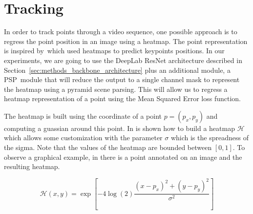 

\section{Tracking}
\label{sec:methods_tracking}

In order to track points through a video sequence, one possible approach is to regress the point position in an image using a heatmap.
The point representation is inspired by~\hourglass which used heatmaps to predict keypoints positions.
In our experiments, we are going to use the DeepLab ResNet architecture described in Section~\ref{sec:methods_backbone_architecture} plus an additional module, a PSP~\pspnet module that will reduce the output to a single channel mask to represent the heatmap using a pyramid scene parsing.
This will allow us to regress a heatmap representation of a point using the Mean Squared Error loss function.

The heatmap is built using the coordinate of a point $p = (p_x, p_y)$ and computing a guassian around this point.
In  is shown how to build a heatmap $\mathcal{H}$ which allows some customization with the parameter $\sigma$ which is the spreadness of the sigma.
Note that the values of the heatmap are bounded between $[0, 1]$.
To observe a graphical example, in  there is a point annotated on an image and the resulting heatmap.

\begin{equation}
  \mathcal{H}(x, y) = \exp \left[ -4 \log(2) \frac{ (x - p_x)^2 + (y - p_y)^2 }{ \sigma^2 } \right]
  \label{eq:heatmap}
\end{equation}

